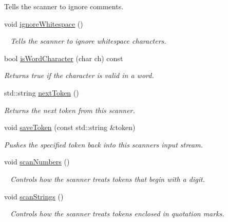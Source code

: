 \begin{DoxyCompactItemize}
\begin{DoxyCompactList}
 Tells the scanner to ignore comments. \end{DoxyCompactList}\item 
void \mbox{\hyperlink{classTokenScanner_a1dd9d28ae227b7e0313be6dd0ecca373}{ignore\+Whitespace}} ()
\begin{DoxyCompactList}\small\item\em ~\newline
 Tells the scanner to ignore whitespace characters. \end{DoxyCompactList}\item 
bool \mbox{\hyperlink{classTokenScanner_ad3446183cc2011a6bb3ebe1ce1c3391a}{is\+Word\+Character}} (char ch) const
\begin{DoxyCompactList}\small\item\em Returns {\ttfamily true} if the character is valid in a word. \end{DoxyCompactList}\item 
std\+::string \mbox{\hyperlink{classTokenScanner_ad515fb115cc77b70c2a498049ba16256}{next\+Token}} ()
\begin{DoxyCompactList}\small\item\em Returns the next token from this scanner. \end{DoxyCompactList}\item 
void \mbox{\hyperlink{classTokenScanner_a6ca063c69febcb61e6b49a210563194f}{save\+Token}} (const std\+::string \&token)
\begin{DoxyCompactList}\small\item\em Pushes the specified token back into this scanner\textquotesingle{}s input stream. \end{DoxyCompactList}\item 
void \mbox{\hyperlink{classTokenScanner_a0bebe5cb8dd72954dc34cf5338db03dc}{scan\+Numbers}} ()
\begin{DoxyCompactList}\small\item\em ~\newline
 Controls how the scanner treats tokens that begin with a digit. \end{DoxyCompactList}\item 
void \mbox{\hyperlink{classTokenScanner_af85e801b4ef298db6ddbfd539a8f45db}{scan\+Strings}} ()
\begin{DoxyCompactList}\small\item\em ~\newline
 Controls how the scanner treats tokens enclosed in quotation marks. \end{DoxyCompactList}\item 

\end{DoxyCompactItemize}
